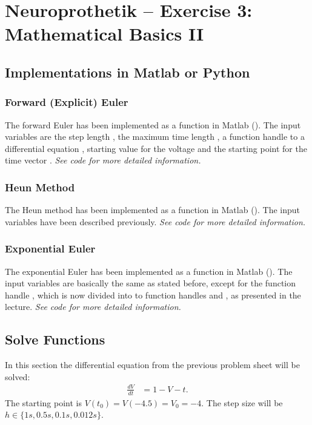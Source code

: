 \documentclass[
a4paper, 
12pt, 
]{article}
\begin{document}
	
	\thispagestyle{firstpage} 			%
	
	\section*{Neuroprothetik -- Exercise 3: Mathematical Basics II}
	\subsection{Implementations in Matlab or Python}
	\subsubsection{Forward (Explicit) Euler}
	The forward Euler has been implemented as a function in Matlab (). The input variables are the step length , the maximum time length , a function handle to a differential equation , starting value for the voltage  and the starting point for the time vector . \emph{See code for more detailed information.} 	
	\subsubsection{Heun Method}
	The Heun method has been implemented as a function in Matlab (). The input variables have been described previously.
	\emph{See code for more detailed information.} 
	\subsubsection{Exponential Euler}
	The exponential Euler has been implemented as a function in Matlab (). The input variables are basically the same as stated before, except for the function handle , which is now divided into to function handles  and , as presented in the lecture. \emph{See code for more detailed information.} 
	
	\subsection{Solve Functions}
	In this section the differential equation from the previous problem sheet will be solved: 
	\begin{align}
	\frac{dV}{dt} &= 1 - V - t.
	\end{align}
	The starting point is $V(t_0) = V(-4.5) = V_0 = -4$. The step size will be $h \in \{1s, 0.5s, 0.1s, 0.012s\}$. 
	
\end{document}
